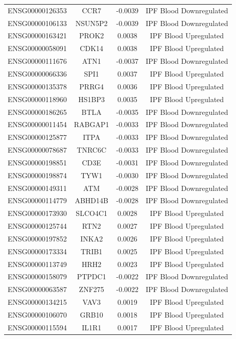 \documentclass[
]{article}
\begin{document}
\begin{singlespace}
\begin{longtable}[t]{lccc}
ENSG00000126353 & CCR7 & -0.0039 & IPF Blood Downregulated\\
ENSG00000106133 & NSUN5P2 & -0.0039 & IPF Blood Downregulated\\
ENSG00000163421 & PROK2 & 0.0038 & IPF Blood Upregulated\\
\addlinespace
ENSG00000058091 & CDK14 & 0.0038 & IPF Blood Upregulated\\
ENSG00000111676 & ATN1 & -0.0037 & IPF Blood Downregulated\\
ENSG00000066336 & SPI1 & 0.0037 & IPF Blood Upregulated\\
ENSG00000135378 & PRRG4 & 0.0036 & IPF Blood Upregulated\\
ENSG00000118960 & HS1BP3 & 0.0035 & IPF Blood Upregulated\\
\addlinespace
ENSG00000186265 & BTLA & -0.0035 & IPF Blood Downregulated\\
ENSG00000011454 & RABGAP1 & -0.0033 & IPF Blood Downregulated\\
ENSG00000125877 & ITPA & -0.0033 & IPF Blood Downregulated\\
ENSG00000078687 & TNRC6C & -0.0033 & IPF Blood Downregulated\\
ENSG00000198851 & CD3E & -0.0031 & IPF Blood Downregulated\\
\addlinespace
ENSG00000198874 & TYW1 & -0.0030 & IPF Blood Downregulated\\
ENSG00000149311 & ATM & -0.0028 & IPF Blood Downregulated\\
ENSG00000114779 & ABHD14B & -0.0028 & IPF Blood Downregulated\\
ENSG00000173930 & SLCO4C1 & 0.0028 & IPF Blood Upregulated\\
ENSG00000125744 & RTN2 & 0.0027 & IPF Blood Upregulated\\
\addlinespace
ENSG00000197852 & INKA2 & 0.0026 & IPF Blood Upregulated\\
ENSG00000173334 & TRIB1 & 0.0025 & IPF Blood Upregulated\\
ENSG00000113749 & HRH2 & 0.0023 & IPF Blood Upregulated\\
ENSG00000158079 & PTPDC1 & -0.0022 & IPF Blood Downregulated\\
ENSG00000063587 & ZNF275 & -0.0022 & IPF Blood Downregulated\\
\addlinespace
ENSG00000134215 & VAV3 & 0.0019 & IPF Blood Upregulated\\
ENSG00000106070 & GRB10 & 0.0018 & IPF Blood Upregulated\\
ENSG00000115594 & IL1R1 & 0.0017 & IPF Blood Upregulated\\

\end{longtable}
\end{singlespace}
\end{document}

